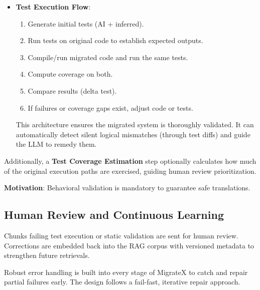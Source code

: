 \documentclass[twocolumn]{article}
\begin{document}
\begin{itemize}
    \item \textbf{Test Execution Flow}:
    \begin{enumerate}
        \item Generate initial tests (AI + inferred).
        \item Run tests on original code to establish expected outputs.
        \item Compile/run migrated code and run the same tests.
        \item Compute coverage on both.
        \item Compare results (delta test).
        \item If failures or coverage gaps exist, adjust code or tests.
    \end{enumerate}

    This architecture ensures the migrated system is thoroughly validated. It can automatically detect silent logical mismatches (through test diffs) and guide the LLM to remedy them.
\end{itemize}

Additionally, a \textbf{Test Coverage Estimation} step optionally calculates how much of the original execution paths are exercised, guiding human review prioritization.

\textbf{Motivation}: Behavioral validation is mandatory to guarantee safe translations.

\subsection{Human Review and Continuous Learning}

Chunks failing test execution or static validation are sent for human review. Corrections are embedded back into the RAG corpus with versioned metadata to strengthen future retrievals.

Robust error handling is built into every stage of MigrateX to catch and repair partial failures early. The design follows a fail-fast, iterative repair approach.
\end{document}
